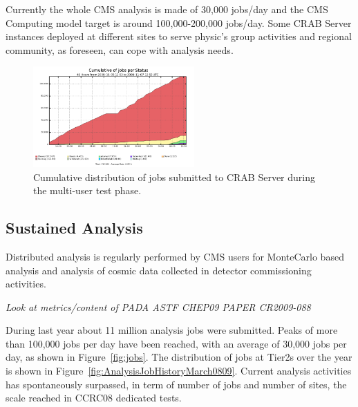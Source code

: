 Currently the whole CMS analysis is made of 30,000 jobs/day and the
CMS Computing model target is around 100,000-200,000 jobs/day. Some
CRAB Server instances deployed at different sites to serve physic's
group activities and regional community, as foreseen, can cope with
analysis needs.
\begin{figure}
\centering
\includegraphics[width=0.55\textwidth]{figures/MultiUserJobStatus.png}
\caption{Cumulative distribution of jobs submitted to CRAB Server
  during the multi-user test phase. }
\label{fig:stressmulti}
\end{figure}



\subsection{Sustained Analysis}
\label{sec:5_2}

Distributed analysis is regularly performed by CMS users for MonteCarlo based analysis
and analysis of cosmic data collected in detector commissioning activities.


\emph{Look at metrics/content of PADA ASTF CHEP09 PAPER CR2009-088}

During last year about 11 million analysis jobs were submitted.  Peaks
of more than 100,000 jobs per day have been reached, with an average
of 30,000 jobs per day, as shown in Figure~\ref{fig:jobs}.
The distribution of jobs at Tier2s over the year is shown in Figure~\ref{fig:AnalysisJobHistoryMarch0809}. Current analysis activities has spontaneously surpassed, in term of number of jobs and number of sites, the scale reached in CCRC08 dedicated tests. 

